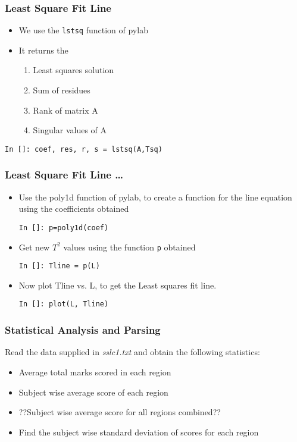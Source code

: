 \documentclass[14pt,compress]{beamer}
\newcommand{\typ}[1]{\lstinline{#1}}
\begin{document}
\begin{frame}[fragile]
\frametitle{Least Square Fit Line}
\begin{itemize}
\item We use the \typ{lstsq} function of pylab
\item It returns the 
\begin{enumerate}
\item Least squares solution
\item Sum of residues
\item Rank of matrix A
\item Singular values of A
\end{enumerate}
\end{itemize}
\begin{lstlisting}
In []: coef, res, r, s = lstsq(A,Tsq)
\end{lstlisting}
\end{frame}

\begin{frame}[fragile]
\frametitle{Least Square Fit Line \ldots}
\begin{itemize}
\item Use the poly1d function of pylab, to create a function for the line equation using the coefficients obtained
\begin{lstlisting}
In []: p=poly1d(coef)
\end{lstlisting}
\item Get new $T^2$ values using the function \typ{p} obtained
\begin{lstlisting}
In []: Tline = p(L)
\end{lstlisting}
\item Now plot Tline vs. L, to get the Least squares fit line. 
\begin{lstlisting}
In []: plot(L, Tline)
\end{lstlisting}
\end{itemize}
\end{frame}

\begin{frame}
  \frametitle{Statistical Analysis and Parsing}
  Read the data supplied in \emph{sslc1.txt} and obtain the following statistics:
  \begin{itemize}
    \item Average total marks scored in each region
    \item Subject wise average score of each region
    \item \alert{??Subject wise average score for all regions combined??}
    \item Find the subject wise standard deviation of scores for each region
  \end{itemize}
\end{frame}
\end{document}
